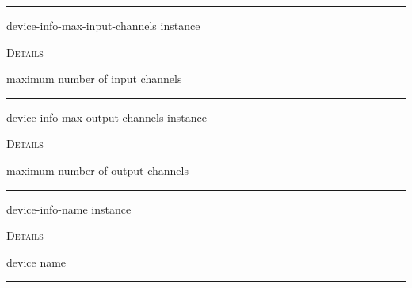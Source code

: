 \documentclass[a4paper]{report}
\begin{document}
  

    \rule{\linewidth}{0.1mm}
    
    \label{portaudio__fun__device-info-max-input-channels}
    \begin{defun}[Function]
    device-info-max-input-channels instance


	
    \bigskip
    \textsc{Details}

maximum number of input channels


    
    \end{defun}
  
  

    \rule{\linewidth}{0.1mm}
    
    \label{portaudio__fun__device-info-max-output-channels}
    \begin{defun}[Function]
    device-info-max-output-channels instance


	
    \bigskip
    \textsc{Details}

maximum number of output channels


    
    \end{defun}
  
  

    \rule{\linewidth}{0.1mm}
    
    \label{portaudio__fun__device-info-name}
    \begin{defun}[Function]
    device-info-name instance


	
    \bigskip
    \textsc{Details}

device name


    
    \end{defun}
  
  

    \rule{\linewidth}{0.1mm}
    
\end{document}
